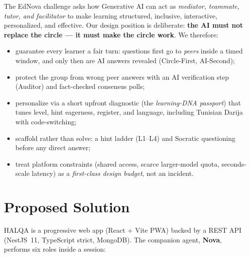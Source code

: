 \documentclass[10pt,twocolumn]{IEEEtran}
\newcommand{\trip}[1]{\textcolor{accg}{\textbf{#1}}}
\begin{document}
The EdNova challenge asks how Generative AI can act as \emph{mediator, teammate, tutor, and facilitator} to make learning structured, inclusive, interactive, personalized, and effective. Our design position is deliberate: \trip{the AI must not replace the circle --- it must make the circle work}. We therefore:

\begin{itemize}
\item guarantee every learner a fair turn: questions first go to \emph{peers} inside a timed window, and only then are AI answers revealed (Circle-First, AI-Second);
\item protect the group from wrong peer answers with an AI verification step (Auditor) and fact-checked consensus polls;
\item personalize via a short upfront diagnostic (the \emph{learning-DNA passport}) that tunes level, hint eagerness, register, and language, including Tunisian Darija with code-switching;
\item scaffold rather than solve: a hint ladder (L1--L4) and Socratic questioning before any direct answer;
\item treat platform constraints (shared access, scarce larger-model quota, seconds-scale latency) as a \emph{first-class design budget}, not an incident.
\end{itemize}

\section{Proposed Solution}
HALQA is a progressive web app (React + Vite PWA) backed by a REST API (NestJS~11, TypeScript strict, MongoDB). The companion agent, \textbf{Nova}, performs six roles inside a session:
\end{document}
